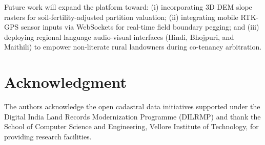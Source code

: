 \documentclass[conference]{IEEEtran}
\begin{document}
Future work will expand the platform toward: (i) incorporating 3D DEM slope rasters for soil-fertility-adjusted partition valuation; (ii) integrating mobile RTK-GPS sensor inputs via WebSockets for real-time field boundary pegging; and (iii) deploying regional language audio-visual interfaces (Hindi, Bhojpuri, and Maithili) to empower non-literate rural landowners during co-tenancy arbitration.

\section*{Acknowledgment}
The authors acknowledge the open cadastral data initiatives supported under the Digital India Land Records Modernization Programme (DILRMP) and thank the School of Computer Science and Engineering, Vellore Institute of Technology, for providing research facilities.
\end{document}
